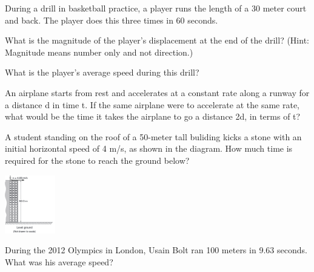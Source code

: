 \documentclass[10pt]{examdesign}
\begin{document}
\begin{multiplechoice} [title={Multiple Choice},
	rearrange=yes]
\begin{block}
During a drill in basketball practice, a player runs the length of a 30 meter court and back.  The player does this three times in 60 seconds. 

\begin{question}
	What is the magnitude of the player's displacement at the end of the drill? (Hint: Magnitude means number only and not direction.)
\end{question}


	\begin{question}
What is the player's average speed during this drill? 
\end{question}
\end{block}


	\begin{question}
An airplane starts from rest and accelerates at a constant rate along a runway for a distance d in time t.  If the same airplane were to accelerate at the same rate, what would be the time it takes the airplane to go a distance 2d, in terms of t?
\end{question}

\begin{question}
A student standing on the roof of a 50-meter tall buliding kicks a stone with an initial horizontal speed of 4 m/s, as shown in the diagram.  How much time is required for the stone to reach the ground below? 

\vspace{-1in} \hspace{2 in} \includegraphics[height=1in]{building.png}

	\end{question}

\begin{question}
During the 2012 Olympics in London, Usain Bolt ran 100 meters in 9.63 seconds.  What was his average speed? 

	
\end{question}



\end{multiplechoice}
\end{document}
